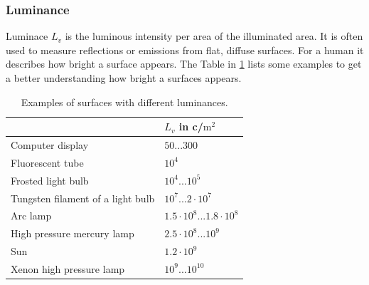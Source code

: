 \subsubsection{Luminance}
Luminace $L_v$ is the luminous intensity per area of the illuminated area. It is often used to measure reflections or emissions from flat, diffuse surfaces.
For a human it describes how bright a surface appears.
The Table in \ref{theory:luminance} lists some examples to get a better understanding how bright a surfaces appears.
\begin{table}[ht]
\begin{tabular}{ |p{11cm}| p{3cm}|  }
	\hline
	& $L_v$ in c/$\text{m}^2$\\
	
	
	\hline
	Computer display					& $50...300$\\
	Fluorescent tube					& $10^4$\\
	Frosted light bulb					& $10^4...10^5$\\
	Tungsten filament of a light bulb	& $10^7...2\cdot 10^7$\\
	Arc lamp							& $1.5\cdot10^8...1.8\cdot10^8$\\
	High pressure mercury lamp			& $2.5\cdot10^8...10^9$\\
	Sun									& $1.2\cdot10^9$\\
	Xenon high pressure lamp			& $10^9...10^10$\\
	
	\hline
\end{tabular}
\caption{Examples of surfaces with different luminances.\label{theory:luminance}}
\end{table}

